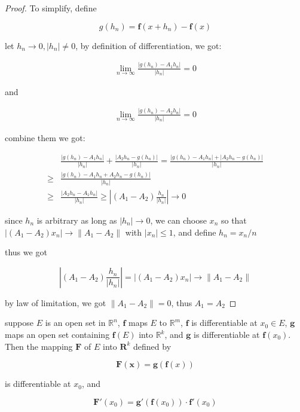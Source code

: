 \begin{proof}
    To simplify, define

    \[
        g(h_n) = \mathbf{f}(x + h_n) - \mathbf{f}(x)
    \]

    let $h_n \to 0, |h_n| \ne 0$, by definition of differentiation, we got:

    \begin{align*}
        \lim_{n \to \infty}\frac{\left| g(h_n) - A_1h_n \right|}{\left| h_n \right|} = 0
    \end{align*}

    and


    \begin{align*}
        \lim_{n \to \infty}\frac{\left| g(h_n) - A_2h_n \right|}{\left| h_n \right|} = 0
    \end{align*}

    combine them we got:


    \begin{align*}
        &\frac{\left| g(h_n) - A_1h_n \right|}{\left| h_n \right|} + \frac{\left|A_2h_n - g(h_n) \right|}{\left| h_n \right|} =  \frac{\left| g(h_n) - A_1h_n \right| + \left| A_2h_n - g(h_n) \right|}{\left| h_n \right|} \\
        \ge & \frac{\left| g(h_n) - A_1h_n  +  A_2h_n - g(h_n) \right|}{\left| h_n \right|}  \\
        \ge & \frac{\left| A_2h_n - A_1h_n  \right|}{\left| h_n \right|}  \ge \left| (A_1- A_2) \frac{h_n}{|h_n|} \right| \to 0
    \end{align*}

    since $h_n$ is arbitrary as long as $|h_n| \to 0$, we can choose $x_n$ so that $|(A_1 - A_2) x_n| \to \| A_1 - A_2 \|$ with $|x_n| \le 1$, and define $h_n = x_n/ n$

    thus we got 

    \[
\left| (A_1- A_2) \frac{h_n}{|h_n|} \right| = \left| (A_1- A_2) x_n \right| \to \| A_1 - A_2 \|
    \]

    by law of limitation, we got $\| A_1 - A_2 \| = 0$, thus $A_1 = A_2$
\end{proof}

\begin{thm}
    suppose $E$ is an open set in $\mathbb{R}^n$, $\mathbf{f}$ maps $E$ to $\mathbb{R}^m$, 
    $\mathbf{f}$ is differentiable at $x_0 \in E$, $\mathbf{g}$ maps an open set 
    containing $\mathbf{f}(E)$ into $\mathbb{R}^k$, and $\mathbf{g}$ is differentiable 
    at $\mathbf{f}(x_0)$. Then the mapping $\mathbf{F}$ of $E$ into $\mathbf{R}^k$
    defined by

    \[
        \mathbf{F}(\mathbf{x}) = \mathbf{g}(\mathbf{f}(x))
    \]

    is differentiable at $x_0$, and

    \[
        \mathbf{F}'(x_0) = \mathbf{g}'(\mathbf{f}(x_0)) \cdot \mathbf{f}'(x_0)
    \]
\end{thm}

